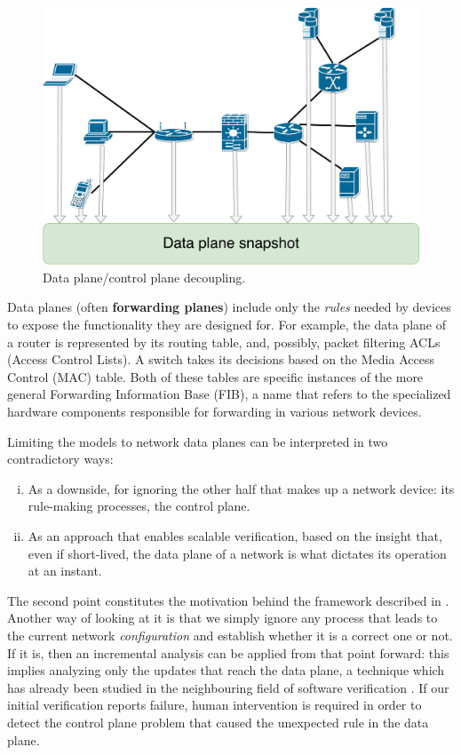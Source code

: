 \begin{figure}[h]
  \centering
  \includegraphics[scale=0.3]{src/img/data-plane-snapshot}
  \caption{Data plane/control plane decoupling.}
  \label{fig:data-plane-snapshot}
\end{figure}

Data planes (often \textbf{forwarding planes}) include only the \emph{rules}
needed by devices to expose the functionality they are designed for.  For
example, the data plane of a router is represented by its routing table, and,
possibly, packet filtering ACLs (Access Control Lists).  A switch takes its decisions based on the Media Access Control
(MAC) table. Both of these tables are
specific instances of the more general Forwarding Information Base
(FIB), a name that refers to the
specialized hardware components responsible for forwarding in various network
devices.

Limiting the models to network data planes can be interpreted in two
contradictory ways:
\begin{enumerate}[(i)]
  \item As a downside, for ignoring the other half that makes up a network
    device: its rule-making processes, the control plane.
  \item As an approach that enables scalable verification, based on the insight
    that, even if short-lived, the data plane of a network is what dictates its
    operation at an instant.
\end{enumerate}

The second point constitutes the motivation behind the framework described in
.  Another way of looking at it is that
we simply ignore any process that leads to the current network
\emph{configuration} and establish whether it is a correct one or not.  If it
is, then an incremental analysis can be applied from that point forward: this
implies analyzing only the updates that reach the data plane, a technique which
has already been studied in the neighbouring field of software verification
\cite{marinescu2013katch}.  If our initial verification reports failure, human
intervention is required in order to detect the control plane problem that
caused the unexpected rule in the data plane.


